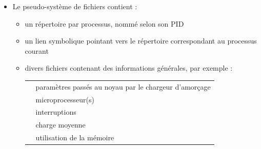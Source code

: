 
\newlength{\largeurtableau}
\setlength{\largeurtableau}{\textwidth}
\addtolength{\largeurtableau}{-2\leftmarginii}


\begin{frame}{}

\begin{itemize}

\item Le pseudo-système de fichiers  contient :

	\begin{itemize}

	\item un répertoire par processus, nommé selon son PID

	\item un lien symbolique  pointant vers le répertoire
	correspondant au processus courant

	\item divers fichiers contenant des informations générales, par
	exemple :

\bigskip

\begin{tabulary}{\largeurtableau}{lJ}
\hline
{}	& paramètres passés au noyau par le chargeur
				d'amorçage		\\
	& microprocesseur(s)		\\
	& interruptions			\\
	& charge moyenne		\\
	& utilisation de la mémoire	\\
\hline
\end{tabulary}

	\end{itemize}

\end{itemize}

\begin{toile}
\end{toile}

\end{frame}


